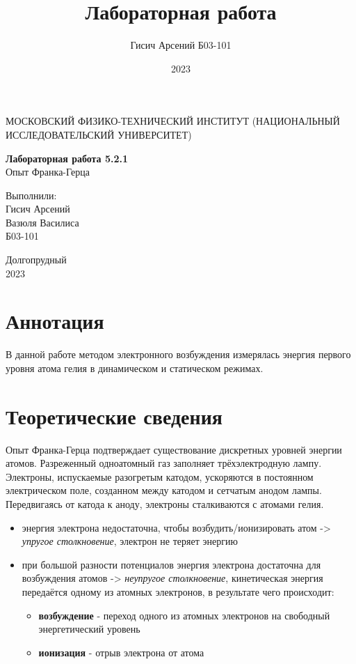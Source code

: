 \documentclass[a4paper, 12pt]{article}
\title{Лабораторная работа}
\author{Гисич Арсений Б03-101}
\date{2023}
\begin{document}
	\begin{center}
		{\large МОСКОВСКИЙ ФИЗИКО-ТЕХНИЧЕСКИЙ ИНСТИТУТ (НАЦИОНАЛЬНЫЙ ИССЛЕДОВАТЕЛЬСКИЙ УНИВЕРСИТЕТ)}
	\end{center}
	\vspace{5 cm}
	{\Large
		\begin{center}
			{\bf Лабораторная работа 5.2.1}\\[0.2 cm]
			Опыт Франка-Герца
		\end{center}
	}
	\vspace{4 cm}
	\begin{flushright}
		{\Large Выполнили: \\
			\vspace{0.2 cm}
			Гисич Арсений \\
            Вазюля Василиса \\ 
			\vspace{0.2 cm}
			Б03-101 \\}
	\end{flushright}
	\vspace{8 cm}
	\begin{center}
		Долгопрудный\\[0.1 cm]
		2023
	\end{center}
\thispagestyle{empty}

\section{Аннотация}

В данной работе методом электронного возбуждения измерялась энергия первого уровня атома гелия в динамическом и статическом режимах.

\section{Теоретические сведения}

Опыт Франка-Герца подтверждает существование дискретных уровней энергии атомов. Разреженный одноатомный газ заполняет трёхэлектродную лампу. Электроны, испускаемые разогретым катодом, ускоряются в постоянном электрическом поле, созданном между катодом и сетчатым анодом лампы. Передвигаясь от катода к аноду, электроны сталкиваются с атомами гелия.
\begin{itemize}
    \item энергия электрона недостаточна, чтобы возбудить/ионизировать атом -> \textit{упругое столкновение}, электрон не теряет энергию
    \item при большой разности потенциалов энергия электрона достаточна для возбуждения атомов -> \textit{неупругое столкновение}, кинетическая энергия передаётся одному из атомных электронов, в результате чего происходит:
    \begin{itemize}
        \item \textbf{возбуждение} - переход одного из атомных электронов на свободный энергетический уровень
        \item \textbf{ионизация} - отрыв электрона от атома 
    \end{itemize}
\end{itemize}
\end{document}
